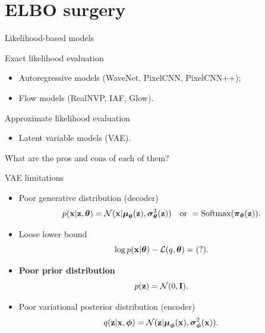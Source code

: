 \section{ELBO surgery}
\begin{frame}{Likelihood-based models}
\begin{block}{Exact likelihood evaluation}
	\begin{itemize}
		\item Autoregressive models (WaveNet, PixelCNN, PixelCNN++);
		\item Flow models (RealNVP, IAF, Glow).
	\end{itemize}
\end{block}
\begin{block}{Approximate likelihood evaluation}
	\begin{itemize}
		\item Latent variable models (VAE).
	\end{itemize}
\end{block}
What are the pros and cons of each of them? \\
\vspace{0.2cm}
\end{frame}
\begin{frame}{VAE limitations}
	\begin{itemize}
		\item Poor generative distribution (decoder)
		\[
			p(\mathbf{x} | \mathbf{z}, \boldsymbol{\theta}) = \mathcal{N}(\mathbf{x}| \boldsymbol{\mu}_{\boldsymbol{\theta}}(\mathbf{z}), \boldsymbol{\sigma}^2_{\boldsymbol{\theta}}(\mathbf{z})) \quad \text{or } = \text{Softmax}(\boldsymbol{\pi}_{\boldsymbol{\theta}}(\mathbf{z})).
		\]
		\item Loose lower bound
		\[
			\log p(\mathbf{x} | \boldsymbol{\theta}) - \mathcal{L}(q, \boldsymbol{\theta}) = (?).
		\]
		\item \textbf{Poor prior distribution}
		\[
			p(\mathbf{z}) = \mathcal{N}(0, \mathbf{I}).
		\]
		\item Poor variational posterior distribution (encoder)
		\[
			q(\mathbf{z} | \mathbf{x}, \boldsymbol{\phi}) = \mathcal{N}(\mathbf{z}| \boldsymbol{\mu}_{\boldsymbol{\phi}}(\mathbf{x}), \boldsymbol{\sigma}^2_{\boldsymbol{\phi}}(\mathbf{x})).
		\]
	\end{itemize}
\end{frame}
